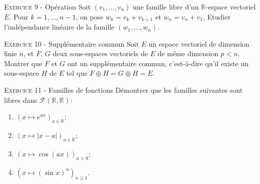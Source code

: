 \documentclass[11pt]{article}
\begin{document}


\vskip0.3cm\noindent\textsc{Exercice 9} - Opération
\vskip0.2cm
Soit $(v_1,\dots,v_n)$ une famille libre d'un $\mathbb R$-espace vectoriel $E$.
Pour $k=1,\dots,n-1$, on pose $w_k=v_k+v_{k+1}$ et $w_n=v_n+v_1$. Etudier 
l'indépendance linéaire de la famille $(w_1,\dots,w_n)$.




\vskip0.3cm\noindent\textsc{Exercice 10} - Supplémentaire commun
\vskip0.2cm
Soit $E$ un espace vectoriel de dimension finie $n$, et $F$, $G$ deux sous-espaces
vectoriels de $E$ de même dimension $p<n$. Montrer que $F$ et $G$ ont un supplémentaire commun,
c'est-à-dire qu'il existe un sous-espace $H$ de $E$ tel que $F\oplus H=G\oplus H=E$.




\vskip0.3cm\noindent\textsc{Exercice 11} - Familles de fonctions
\vskip0.2cm
Démontrer que les familles suivantes sont libres dans $\mathcal F(\mathbb R,\mathbb R)$:
\begin{enumerate}
\item $(x\mapsto e^{ax})_{a\in\mathbb R}$;
\item $(x\mapsto |x-a|)_{a\in\mathbb R}$;
\item $(x\mapsto \cos(ax))_{a>0}$;
\item $(x\mapsto (\sin x)^n)_{n\geq 1}$.
\end{enumerate}





\vskip0.5cm

\end{document}
